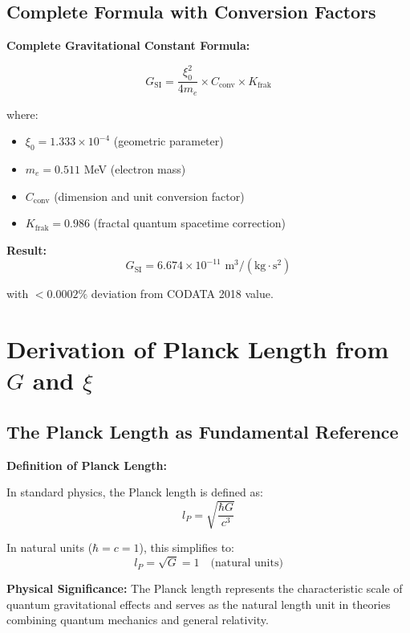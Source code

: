 \documentclass[12pt,a4paper]{article}
\begin{document}
	\subsection{Complete Formula with Conversion Factors}
	
	\begin{keyresult}
		\textbf{Complete Gravitational Constant Formula:}
		
		\begin{equation}
			\boxed{G_{\text{SI}} = \frac{\xi_0^2}{4 m_e} \times C_{\text{conv}} \times K_{\text{frak}}}
			\label{eq:G_complete}
		\end{equation}
		
		where:
		\begin{itemize}
			\item $\xi_0 = 1.333 \times 10^{-4}$ (geometric parameter)
			\item $m_e = 0.511$ MeV (electron mass)
			\item $C_{\text{conv}}$ (dimension and unit conversion factor)
			\item $K_{\text{frak}} = 0.986$ (fractal quantum spacetime correction)
		\end{itemize}
		
		\textbf{Result:}
		\begin{equation}
			G_{\text{SI}} = 6.674 \times 10^{-11} \text{ m}^3/(\text{kg}\cdot\text{s}^2)
		\end{equation}
		
		with $<0.0002\%$ deviation from CODATA 2018 value.
	\end{keyresult}
	
	\section{Derivation of Planck Length from $G$ and $\xi$}
	
	\subsection{The Planck Length as Fundamental Reference}
	
	\begin{derivation}
		\textbf{Definition of Planck Length:}
		
		In standard physics, the Planck length is defined as:
		\begin{equation}
			l_P = \sqrt{\frac{\hbar G}{c^3}}
			\label{eq:planck_length_standard}
		\end{equation}
		
		In natural units ($\hbar = c = 1$), this simplifies to:
		\begin{equation}
			\boxed{l_P = \sqrt{G} = 1 \quad \text{(natural units)}}
			\label{eq:planck_natural}
		\end{equation}
		
		\textbf{Physical Significance:} The Planck length represents the characteristic scale of quantum gravitational effects and serves as the natural length unit in theories combining quantum mechanics and general relativity.
	\end{derivation}
	
\end{document}
